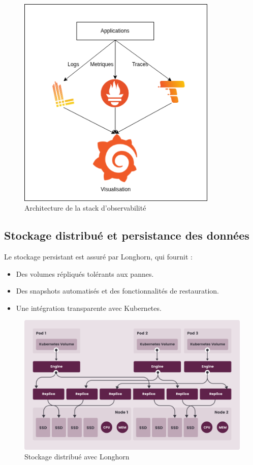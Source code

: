 \begin{figure}[H]
	\centering
	\includegraphics[width=0.85\textwidth]{figures/observabilite-stack.png}
	\caption{Architecture de la stack d'observabilité}
\end{figure}

\subsection{Stockage distribué et persistance des données}

Le stockage persistant est assuré par Longhorn, qui fournit :
\begin{itemize}
	\item Des volumes répliqués tolérants aux pannes.
	\item Des snapshots automatisés et des fonctionnalités de restauration.
	\item Une intégration transparente avec Kubernetes.
\end{itemize}

\begin{figure} [H]
	\centering
	\includegraphics[width=.5\textwidth]{figures/how-longhorn-works.png}
	\caption{Stockage distribué avec Longhorn}
\end{figure}

